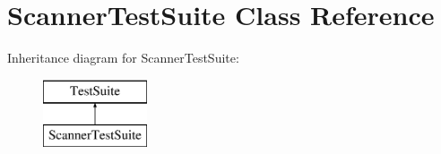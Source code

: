 \hypertarget{class_scanner_test_suite}{}\section{Scanner\+Test\+Suite Class Reference}
\label{class_scanner_test_suite}
Inheritance diagram for Scanner\+Test\+Suite\+:\begin{figure}[H]
\begin{center}
\leavevmode
\includegraphics[height=2.000000cm]{class_scanner_test_suite}
\end{center}
\end{figure}
